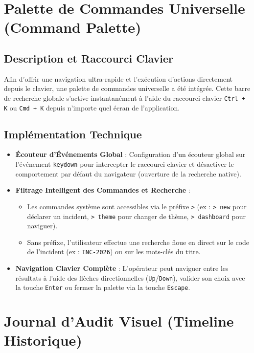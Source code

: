 \documentclass[12pt,a4paper]{article}
\begin{document}
\section{Palette de Commandes Universelle (Command Palette)}
\subsection{Description et Raccourci Clavier}
Afin d'offrir une navigation ultra-rapide et l'exécution d'actions directement depuis le clavier, une palette de commandes universelle a été intégrée. Cette barre de recherche globale s'active instantanément à l'aide du raccourci clavier \texttt{Ctrl + K} ou \texttt{Cmd + K} depuis n'importe quel écran de l'application.

\subsection{Implémentation Technique}
\begin{itemize}
    \item \textbf{Écouteur d'Événements Global} : Configuration d'un écouteur global sur l'événement \texttt{keydown} pour intercepter le raccourci clavier et désactiver le comportement par défaut du navigateur (ouverture de la recherche native).
    \item \textbf{Filtrage Intelligent des Commandes et Recherche} :
    \begin{itemize}
        \item Les commandes système sont accessibles via le préfixe \texttt{>} (ex : \texttt{> new} pour déclarer un incident, \texttt{> theme} pour changer de thème, \texttt{> dashboard} pour naviguer).
        \item Sans préfixe, l'utilisateur effectue une recherche floue en direct sur le code de l'incident (ex : \texttt{INC-2026}) ou sur les mots-clés du titre.
    \end{itemize}
    \item \textbf{Navigation Clavier Complète} : L'opérateur peut naviguer entre les résultats à l'aide des flèches directionnelles (\texttt{Up}/\texttt{Down}), valider son choix avec la touche \texttt{Enter} ou fermer la palette via la touche \texttt{Escape}.
\end{itemize}

\section{Journal d'Audit Visuel (Timeline Historique)}
\end{document}
